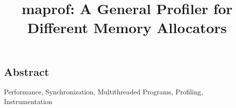\documentclass[preprint,10pt]{sigplanconf}
\begin{document}
\setlength{\pdfpageheight}{\paperheight}
\setlength{\pdfpagewidth}{\paperwidth}

\title{maprof: A General Profiler for Different Memory Allocators}

\authorinfo{}


\maketitle

\subsection*{Abstract}



\keywords
Performance, Synchronization, Multithreaded Programs, Profiling, Instrumentation


%








{


}
\end{document}
